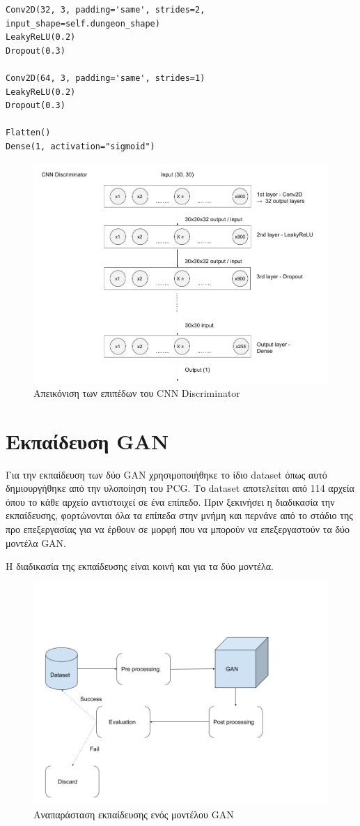 \begin{verbatim}
Conv2D(32, 3, padding='same', strides=2, input_shape=self.dungeon_shape)
LeakyReLU(0.2)
Dropout(0.3)

Conv2D(64, 3, padding='same', strides=1)
LeakyReLU(0.2)
Dropout(0.3)

Flatten()
Dense(1, activation="sigmoid")

\end{verbatim}

\begin{figure}[H]
\centering
\includegraphics[width=.8\linewidth]{../images/graphs/CNN_discriminator.png}
\caption{Απεικόνιση των επιπέδων του CNN Discriminator}
\label{fig:fig}
\end{figure}

\section{Εκπαίδευση GAN}
Για την εκπαίδευση των δύο GAN χρησιμοποιήθηκε το ίδιο dataset όπως αυτό δημιουργήθηκε από την υλοποίηση του PCG. Το dataset αποτελείται από 114 αρχεία όπου το κάθε αρχείο αντιστοιχεί σε ένα επίπεδο. Πριν ξεκινήσει η διαδικασία την εκπαίδευσης, φορτώνονται όλα τα επίπεδα στην μνήμη και περνάνε από το στάδιο της προ επεξεργασίας για να έρθουν σε μορφή που να μπορούν να επεξεργαστούν τα δύο μοντέλα GAN.
\par
Η διαδικασία της εκπαίδευσης είναι κοινή και για τα δύο μοντέλα.


\begin{figure}[H]
\centering
\includegraphics[width=.8\linewidth]{../images/graphs/Abstract_functionality.png}
\caption{Αναπαράσταση εκπαίδευσης ενός μοντέλου GAN}
\label{fig:fig}
\end{figure}

